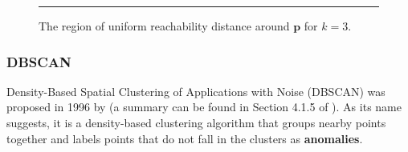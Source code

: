 \begin{figure}[H]
\hrule \vspace{0.4cm} \centering
{}
\caption{The region of uniform reachability distance around $\mathbf{p}$ for $k=3$.}
\label{reachability}
\end{figure}
\newpage\noindent  

\subsubsection*{DBSCAN}
Density-Based Spatial Clustering of Applications with Noise (DBSCAN) was proposed in 1996 by \cite{DBSCAN} 
(a summary can be found in Section 4.1.5 of \cite{A10}). 
As its name suggests, it is a density-based clustering algorithm that groups nearby points together and labels points that do not fall in the clusters as \textbf{anomalies}.

